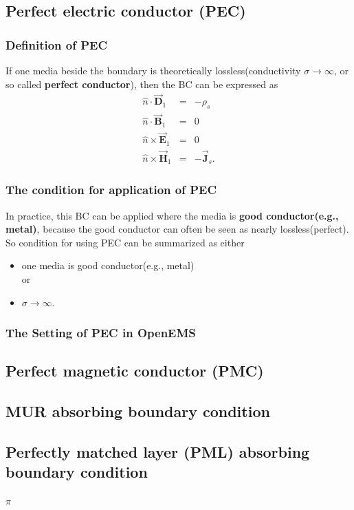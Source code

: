     \subsection{Perfect electric conductor (PEC)}\label{subsec:PEC}
    \subsubsection{Definition of PEC}
    If one media beside the boundary is theoretically lossless(conductivity $\sigma\rightarrow\infty$, or so called \textbf{perfect conductor}), then the BC can be expressed as
	    \begin{eqnarray}
		\hat{n}\cdot\vec{\mathbf{D}}_1 &=&-\rho_s  \\
		\hat{n}\cdot\vec{\mathbf{B}}_1 &=&0  \\
		\hat{n}\times\vec{\mathbf{E}}_1 &=&0\\
		\hat{n}\times\vec{\mathbf{H}}_1 &=&-\vec{\mathbf{J}}_s .
		\label{eq:PEC boundary conditions}
	    \end{eqnarray}
    \subsubsection{The condition for application of PEC}
    In practice, this BC can be applied where the media  is \textbf{good conductor(e.g., metal)}, because the good conductor can often be seen as nearly lossless(perfect). So condition for using PEC can be summarized as either
    \begin{itemize}
    \item one media is good conductor(e.g., metal) \\
    or
    \item $\sigma\rightarrow\infty$.
    \end{itemize}
    \subsubsection{The Setting of PEC in OpenEMS}


\subsection{Perfect magnetic conductor (PMC)}\label{subsec:PMC}

\subsection{MUR absorbing boundary condition}\label{subsec:MUR}

\subsection{Perfectly matched layer (PML) absorbing boundary condition}\label{subsec:PML}
$\pi$